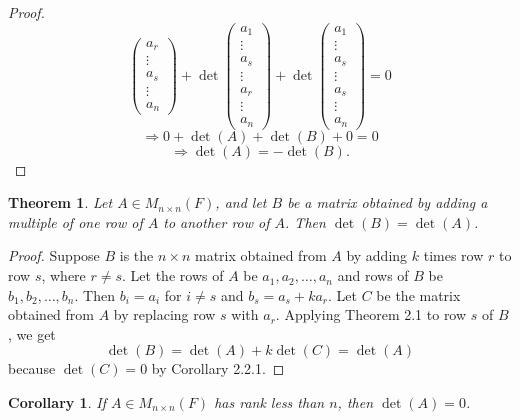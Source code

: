 \documentclass[12pt, a4paper]{article}
\newtheorem{theorem}{Theorem}[section]
\newtheorem{corollary}{Corollary}[theorem]
\theoremstyle{definition}
\theoremstyle{remark}
\begin{document}
\begin{proof}
\[\begin{pmatrix}
        a_r \\
        \vdots \\
        a_s \\
        \vdots \\
        a_n
        \end{pmatrix}
        + \det \begin{pmatrix}
        a_1 \\
        \vdots \\
        a_s \\
        \vdots \\
        a_r \\
        \vdots \\
        a_n
        \end{pmatrix}
        + \det \begin{pmatrix}
        a_1 \\
        \vdots \\
        a_s \\
        \vdots \\
        a_s \\
        \vdots \\
        a_n
        \end{pmatrix} = 0
        \]
        \[
        \Rightarrow 0 + \det(A) + \det(B) + 0 = 0
        \]
        \[
        \Rightarrow \det(A) = -\det(B).
        \]
        \end{proof}

        \begin{theorem}
        Let $A \in M_{n \times n}(F)$, and let $B$ be a matrix obtained by adding a multiple of one row of $A$ to another row of $A$. Then $\det(B) = \det(A)$.
        \end{theorem}

        \begin{proof}
        Suppose $B$ is the $n \times n$ matrix obtained from $A$ by adding $k$ times row $r$ to row $s$, where $r \neq s$. Let the rows of $A$ be $a_1, a_2, \dots, a_n$ and rows of $B$ be $b_1, b_2, \dots, b_n$. Then $b_i = a_i$ for $i \neq s$ and $b_s = a_s + k a_r$. Let $C$ be the matrix obtained from $A$ by replacing row $s$ with $a_r$. Applying Theorem 2.1 to row $s$ of $B$, we get
        \[
        \det(B) = \det(A) + k \det(C) = \det(A)
        \]
        because $\det(C) = 0$ by Corollary 2.2.1.
        \end{proof}

        \begin{corollary}
        If $A \in M_{n \times n}(F)$ has rank less than $n$, then $\det(A) = 0$.
        \end{corollary}
\end{document}
